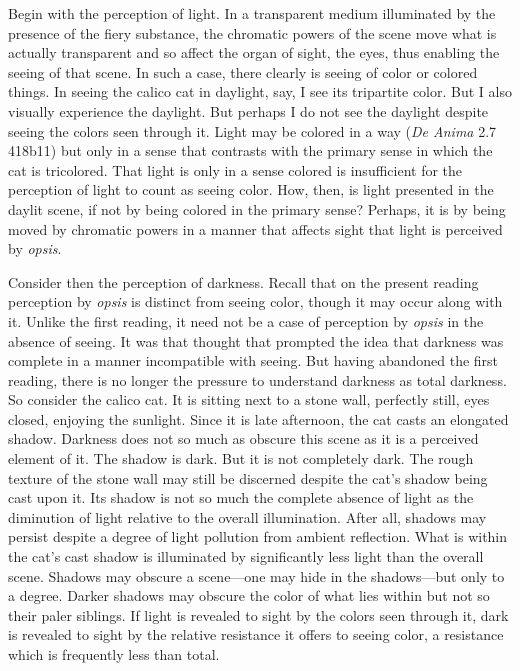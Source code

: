 Begin with the perception of light. In a transparent medium illuminated by the presence of the fiery substance, the chromatic powers of the scene move what is actually transparent and so affect the organ of sight, the eyes, thus enabling the seeing of that scene. In such a case, there clearly is seeing of color or colored things. In seeing the calico cat in daylight, say, I see its tripartite color. But I also visually experience the daylight. But perhaps I do not see the daylight despite seeing the colors seen through it. Light may be colored in a way (\emph{De Anima} 2.7 418b11) but only in a sense that contrasts with the primary sense in which the cat is tricolored. That light is only in a sense colored is insufficient for the perception of light to count as seeing color. How, then, is light presented in the daylit scene, if not by being colored in the primary sense? Perhaps, it is by being moved by chromatic powers in a manner that affects sight that light is perceived by \emph{opsis}.


Consider then the perception of darkness. Recall that on the present reading perception by \emph{opsis} is distinct from seeing color, though it may occur along with it. Unlike the first reading, it need not be a case of perception by \emph{opsis} in the absence of seeing. It was that thought that prompted the idea that darkness was complete in a manner incompatible with seeing. But having abandoned the first reading, there is no longer the pressure to understand darkness as total darkness. So consider the calico cat. It is sitting next to a stone wall, perfectly still, eyes closed, enjoying the sunlight. Since it is late afternoon, the cat casts an elongated shadow. Darkness does not so much as obscure this scene as it is a perceived element of it. The shadow is dark. But it is not completely dark. The rough texture of the stone wall may still be discerned despite the cat's shadow being cast upon it. Its shadow is not so much the complete absence of light as the diminution of light relative to the overall illumination. After all, shadows may persist despite a degree of light pollution from ambient reflection. What is within the cat's cast shadow is illuminated by significantly less light than the overall scene. Shadows may obscure a scene—one may hide in the shadows—but only to a degree. Darker shadows may obscure the color of what lies within but not so their paler siblings. If light is revealed to sight by the colors seen through it, dark is revealed to sight by the relative resistance it offers to seeing color, a resistance which is frequently less than total.

